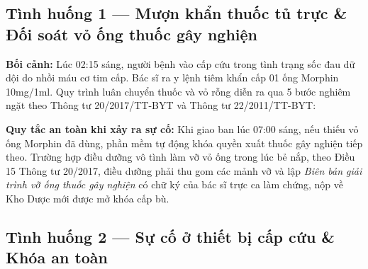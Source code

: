 \documentclass[11pt,a4paper]{article}
\begin{document}
\subsection{Tình huống 1 — Mượn khẩn thuốc tủ trực \& Đối soát vỏ ống thuốc gây nghiện}

\textbf{Bối cảnh:} Lúc 02:15 sáng, người bệnh vào cấp cứu trong tình trạng sốc đau dữ dội do nhồi máu cơ tim cấp. Bác sĩ ra y lệnh tiêm khẩn cấp 01 ống Morphin 10mg/1ml. Quy trình luân chuyển thuốc và vỏ rỗng diễn ra qua 5 bước nghiêm ngặt theo Thông tư 20/2017/TT-BYT và Thông tư 22/2011/TT-BYT:

\vspace{-0.2em}
\begin{center}
\end{center}

\vspace{-0.3em}
\noindent\textbf{Quy tắc an toàn khi xảy ra sự cố:} Khi giao ban lúc 07:00 sáng, nếu thiếu vỏ ống Morphin đã dùng, phần mềm tự động khóa quyền xuất thuốc gây nghiện tiếp theo. Trường hợp điều dưỡng vô tình làm vỡ vỏ ống trong lúc bẻ nắp, theo Điều 15 Thông tư 20/2017, điều dưỡng phải thu gom các mảnh vỡ và lập \textit{Biên bản giải trình vỡ ống thuốc gây nghiện} có chữ ký của bác sĩ trực ca làm chứng, nộp về Kho Dược mới được mở khóa cấp bù.

\newpage
\subsection{Tình huống 2 — Sự cố ở thiết bị cấp cứu \& Khóa an toàn}
\end{document}
